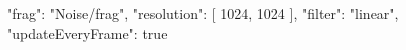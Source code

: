{
  "frag": "Noise/frag",
  "resolution": [
    1024,
    1024
  ],
  "filter": "linear",
  "updateEveryFrame": true
}
